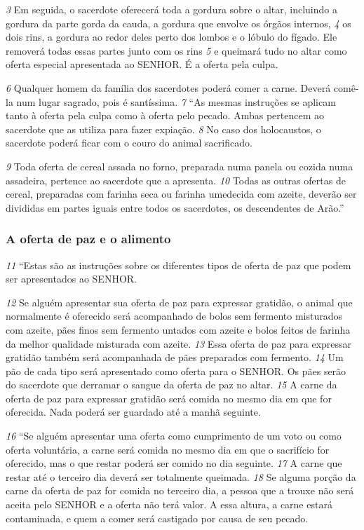 \smallskip
\textit{\tiny 3} 
Em seguida, o sacerdote oferecerá toda a gordura sobre o altar, incluindo a gordura
da parte gorda da cauda, a gordura que envolve os órgãos internos, 
\textit{\tiny 4} 
os dois rins, a gordura ao redor deles perto dos lombos e o lóbulo do fígado. Ele removerá todas
essas partes junto com os rins 
\textit{\tiny 5} 
e queimará tudo no altar como oferta especial
apresentada ao SENHOR. É a oferta pela culpa. 

\smallskip
\textit{\tiny 6} 
Qualquer homem da família dos
sacerdotes poderá comer a carne. Deverá comê-la num lugar sagrado, pois é
santíssima. 
\textit{\tiny 7} 
“As mesmas instruções se aplicam tanto à oferta pela culpa como à oferta pelo
pecado. Ambas pertencem ao sacerdote que as utiliza para fazer expiação. 
\textit{\tiny 8} 
No caso dos holocaustos, o sacerdote poderá ficar com o couro do animal
sacrificado. 

\smallskip
\textit{\tiny 9} 
Toda oferta de cereal assada no forno, preparada numa panela ou
cozida numa assadeira, pertence ao sacerdote que a apresenta. 
\textit{\tiny 10}
Todas as outras
ofertas de cereal, preparadas com farinha seca ou farinha umedecida com azeite,
deverão ser divididas em partes iguais entre todos os sacerdotes, os descendentes
de Arão.”

\bigskip
\subsubsection*{A oferta de paz e o alimento}  
\textit{\tiny 11}
“Estas são as instruções sobre os diferentes tipos de oferta de paz que podem
ser apresentados ao SENHOR. 

\smallskip
\textit{\tiny 12}
Se alguém apresentar sua oferta de paz para
expressar gratidão, o animal que normalmente é oferecido será acompanhado de
bolos sem fermento misturados com azeite, pães finos sem fermento untados
com azeite e bolos feitos de farinha da melhor qualidade misturada com azeite.
\textit{\tiny 13}
Essa oferta de paz para expressar gratidão também será acompanhada de pães
preparados com fermento. 
\textit{\tiny 14}
Um pão de cada tipo será apresentado como oferta
para o SENHOR. Os pães serão do sacerdote que derramar o sangue da oferta de
paz no altar. 
\textit{\tiny 15}
A carne da oferta de paz para expressar gratidão será comida no
mesmo dia em que for oferecida. Nada poderá ser guardado até a manhã
seguinte.
   
\smallskip
\textit{\tiny 16}
“Se alguém apresentar uma oferta como cumprimento de um voto ou como
oferta voluntária, a carne será comida no mesmo dia em que o sacrifício for
oferecido, mas o que restar poderá ser comido no dia seguinte. 
\textit{\tiny 17}
A carne que
restar até o terceiro dia deverá ser totalmente queimada. 
\textit{\tiny 18}
Se alguma porção da
carne da oferta de paz for comida no terceiro dia, a pessoa que a trouxe não será
aceita pelo SENHOR e a oferta não terá valor. A essa altura, a carne estará
contaminada, e quem a comer será castigado por causa de seu pecado.
   

